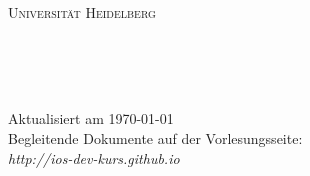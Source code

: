 \begin{titlepage}

\begin{center}

\makeatletter

\textsc{
{\LARGE Universität Heidelberg}\\[0.4cm]
{\Large \semester}
}\\[6cm]

{\Huge \bfseries \@title}\\[1cm]
\textsc{\LARGE \@subtitle}



\vfill


\textsc{\Large \@author\\[1.5cm]}

\begin{minipage}{\textwidth}
\begin{flushleft} \large
{\large
Aktualisiert am \today\\
Begleitende Dokumente auf der Vorlesungsseite:\\
\emph{http://ios-dev-kurs.github.io}
}
\end{flushleft}
\end{minipage}


\makeatother

\end{center}

\end{titlepage}
